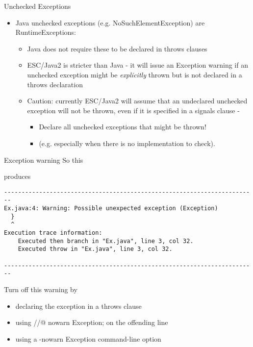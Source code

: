 \documentclass[
pdf,
nocolorBG,
slideColor,
cok,
]{prosper}
\begin{document}
\begin{slide}{Unchecked Exceptions}

\vspace*{-6ex}
\begin{itemize}
\item Java {\knalblue unchecked} exceptions (e.g. NoSuchElementException) are RuntimeExceptions:
\begin{itemize}
\item Java does not require these to be declared in throws clauses
\item ESC/Java2 is stricter than Java - it will issue an Exception warning if an unchecked exception might be {\it explicitly} thrown but is not declared in a throws declaration 
\item Caution: currently ESC/Java2 will assume that an undeclared unchecked exception will not be thrown, even if it is specified in a signals clause - 
\begin{itemize}
\item[] Declare all unchecked exceptions that might be thrown! 
\item[] (e.g. especially when there is no implementation to check).
\end{itemize}
\end{itemize}

\end{itemize}
\end{slide}
\begin{slide}{Exception warning}
\vspace*{-12ex}
So this
\begin{figure*}
\tiny

\end{figure*}
produces
{\tiny
\begin{verbatim}
------------------------------------------------------------------------
Ex.java:4: Warning: Possible unexpected exception (Exception)
  }
  ^
Execution trace information:
    Executed then branch in "Ex.java", line 3, col 32.
    Executed throw in "Ex.java", line 3, col 32.

------------------------------------------------------------------------
\end{verbatim}
}
Turn off this warning by
\begin{itemize}
\item declaring the exception in a throws clause
\item using {\knalblue //@ nowarn Exception; } on the offending line
\item using a {\knalblue -nowarn Exception} command-line option
\end{itemize}
\end{slide}
\end{document}
